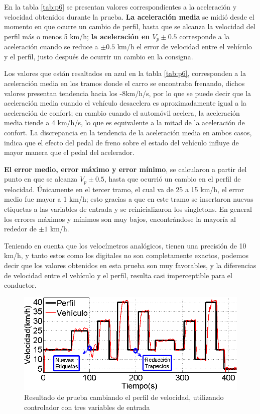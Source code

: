 En la tabla \ref{tab:p6} se presentan valores correspondientes a la aceleración y velocidad obtenidos durante la prueba. \textbf{La aceleración media} se midió desde el momento en que ocurre un cambio de perfil, hasta que se alcanza la velocidad del perfil más o menos 5 km/h; \textbf{la aceleración en $V_p\pm0.5$} corresponde a la aceleración cuando se reduce a $\pm0.5$ km/h el error de velocidad entre el vehículo y el perfil, justo después de ocurrir un cambio en la consigna. 

Los valores que están resaltados en azul en la tabla \ref{tab:p6}, corresponden a la aceleración media en los tramos donde el carro se encontraba frenando, dichos valores presentan tendencia hacia los -8km/h/s, por lo que se puede decir que la aceleración media cuando el vehículo desacelera es aproximadamente igual a la aceleración de confort; en cambio cuando el automóvil acelera, la aceleración media tiende a 4 km/h/s, lo que es equivalente a la mitad de la aceleración de confort. La discrepancia en la tendencia de la aceleración media en ambos casos, indica que el efecto del pedal de freno sobre el estado del vehículo influye de mayor manera que el pedal del acelerador.  

\textbf{El error medio, error máximo y error mínimo}, se calcularon a partir del punto en que se alcanza $V_p\pm0.5$, hasta que ocurrió un cambio en el perfil de velocidad. Únicamente en el tercer tramo, el cual va de 25 a 15 km/h, el error medio fue mayor a 1 km/h; esto gracias a que en este tramo se insertaron nuevas etiquetas a las variables de entrada y se reinicializaron los singletons. En general los errores máximos y mínimos son muy bajos, encontrándose la mayoría al rededor de $\pm 1$ km/h.

Teniendo en cuenta que los velocímetros analógicos, tienen una precisión de 10 km/h, y tanto estos como los digitales  no son completamente exactos,  podemos decir que los valores obtenidos en esta prueba son muy favorables, y la diferencias de velocidad entre el vehículo y el perfil, resulta casi imperceptible para el conductor. 
\begin{figure}[htb]
\centering
\includegraphics[width=0.6\linewidth]{figures/finalcambios.png}
\caption{Resultado de prueba cambiando el perfil de velocidad, utilizando controlador con tres variables de entrada}
\label{fig:finalcambios}
\end{figure}

